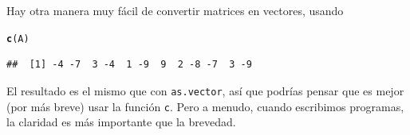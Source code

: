 \documentclass[10pt,a4paper]{article}\usepackage[]{graphicx}\usepackage[]{color}
\makeatletter
\newcommand{\hlstd}[1]{\textcolor[rgb]{0.345,0.345,0.345}{#1}}%
\newcommand{\hlkwd}[1]{\textcolor[rgb]{0.737,0.353,0.396}{\textbf{#1}}}%
\newenvironment{kframe}{%
 \def\at@end@of@kframe{}%
 \ifinner\ifhmode%
  \def\at@end@of@kframe{\end{minipage}}%
  \begin{minipage}{\columnwidth}%
 \fi\fi%
 \def\FrameCommand##1{\hskip\@totalleftmargin \hskip-\fboxsep
 \colorbox{shadecolor}{##1}\hskip-\fboxsep
     \hskip-\linewidth \hskip-\@totalleftmargin \hskip\columnwidth}%
 \MakeFramed {\advance\hsize-\width
   \@totalleftmargin\z@ \linewidth\hsize
   \@setminipage}}%
 {\par\unskip\endMakeFramed%
 \at@end@of@kframe}
\newenvironment{knitrout}{}{} %
\makeatother
\begin{document}
     Hay otra manera muy fácil de convertir matrices en vectores, usando
\begin{knitrout}
\color{fgcolor}\begin{kframe}
\begin{alltt}
     \hlkwd{c}\hlstd{(A)}
\end{alltt}
\begin{verbatim}
##  [1] -4 -7  3 -4  1 -9  9  2 -8 -7  3 -9
\end{verbatim}
\end{kframe}
\end{knitrout}
     El resultado es el mismo que con {\tt as.vector}, así que podrías pensar que es mejor (por más breve) usar la función {\tt c}. Pero a menudo, cuando escribimos programas, la claridad es más importante que la brevedad.
\end{document}
